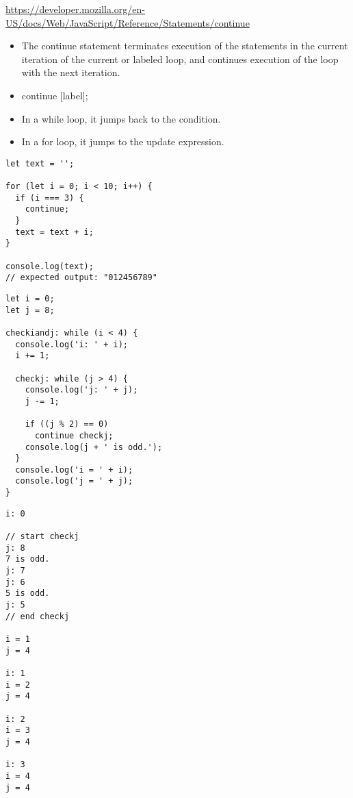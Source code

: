 \documentclass[10pt]{article}
\begin{document}
\url{https://developer.mozilla.org/en-US/docs/Web/JavaScript/Reference/Statements/continue}

\begin{itemize}
	\item The continue statement terminates execution of the statements in the current iteration of the current or labeled loop, and continues execution of the loop with the next iteration.
	\item continue [label];
	\item In a while loop, it jumps back to the condition.
	\item In a for loop, it jumps to the update expression.
\end{itemize}

\begin{lstlisting}[title=Example continue, captionpos=t]
let text = '';

for (let i = 0; i < 10; i++) {
  if (i === 3) {
    continue;
  }
  text = text + i;
}

console.log(text);
// expected output: "012456789"

\end{lstlisting}

\begin{lstlisting}[title=Example continue and label, captionpos=t]
let i = 0;
let j = 8;

checkiandj: while (i < 4) {
  console.log('i: ' + i);
  i += 1;

  checkj: while (j > 4) {
    console.log('j: ' + j);
    j -= 1;

    if ((j % 2) == 0)
      continue checkj;
    console.log(j + ' is odd.');
  }
  console.log('i = ' + i);
  console.log('j = ' + j);
}
\end{lstlisting}

\begin{lstlisting}[title=Example output continue and label, captionpos=t]
i: 0

// start checkj
j: 8
7 is odd.
j: 7
j: 6
5 is odd.
j: 5
// end checkj

i = 1
j = 4

i: 1
i = 2
j = 4

i: 2
i = 3
j = 4

i: 3
i = 4
j = 4
\end{lstlisting}


\medskip %
\end{document}
